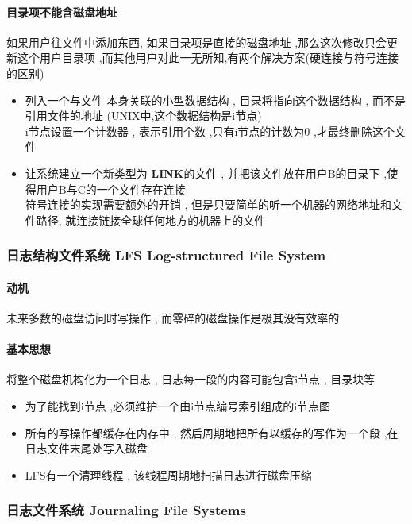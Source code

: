 \documentclass[UTF8,a4paper]{ctexart}
\begin{document}
\paragraph{目录项不能含磁盘地址}  如果用户往文件中添加东西, 如果目录项是直接的磁盘地址 ,那么这次修改只会更新这个用户目录项 ,而其他用户对此一无所知,有两个解决方案(硬连接与符号连接的区别)
\begin{itemize}
	\item 列入一个与文件 本身关联的小型数据结构 , 目录将指向这个数据结构 , 而不是引用文件的地址 (UNIX中,这个数据结构是i节点)\\
	      i节点设置一个计数器 , 表示引用个数 ,只有i节点的计数为0  ,才最终删除这个文件
	\item 让系统建立一个新类型为 \textbf{LINK}的文件 , 并把该文件放在用户B的目录下 ,使得用户B与C的一个文件存在连接 \\
	      符号连接的实现需要额外的开销 , 但是只要简单的听一个机器的网络地址和文件路径, 就连接链接全球任何地方的机器上的文件
\end{itemize}

\subsubsection{日志结构文件系统 LFS Log-structured File System}
\paragraph{动机}  未来多数的磁盘访问时写操作 , 而零碎的磁盘操作是极其没有效率的

\paragraph{基本思想} 将整个磁盘机构化为一个日志 , 日志每一段的内容可能包含i节点 , 目录块等

\begin{itemize}
	\item 为了能找到i节点 ,必须维护一个由i节点编号索引组成的i节点图
	\item 所有的写操作都缓存在内存中 , 然后周期地把所有以缓存的写作为一个段 ,在日志文件末尾处写入磁盘
	\item LFS有一个清理线程 , 该线程周期地扫描日志进行磁盘压缩
\end{itemize}

\subsubsection{日志文件系统 Journaling File Systems}
\end{document}
